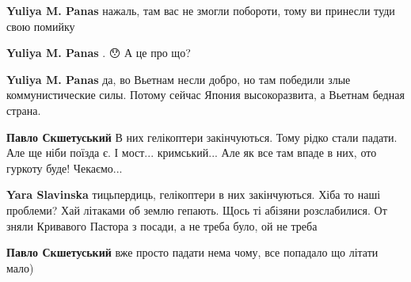 \begin{itemize}
\begin{itemize}
\begin{itemize}
\textbf{Yuliya M. Panas} нажаль, там вас не змогли побороти, тому ви принесли туди свою помийку

 
\textbf{Yuliya M. Panas} . 😯 А це про що?

 
\textbf{Yuliya M. Panas} да, во Вьетнам несли добро, но там победили злые коммунистические силы. Потому сейчас Япония высокоразвита, а Вьетнам бедная страна.
\end{itemize}

 
\textbf{Павло Скшетуський} В них гелікоптери закінчуються. Тому рідко стали
падати. Але ще ніби поїзда є. І мост... кримський... Але як все там впаде в
них, ото гуркоту буде! Чекаємо...

\begin{itemize}
 
\textbf{Yara Slavinska} тицьпердиць, гелікоптери в них закінчуються. Хіба то
наші проблеми? Хай літаками об землю гепають. Щось ті абізяни розслабилися. От
зняли Кривавого Пастора з посади, а не треба було, ой не треба
\end{itemize}

 
\textbf{Павло Скшетуський} вже просто падати нема чому, все попадало що літати мало)


\end{itemize}
\end{itemize}
